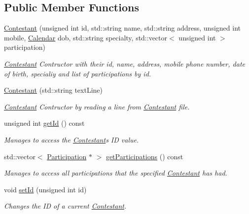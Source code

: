 \subsection*{Public Member Functions}
\begin{DoxyCompactItemize}
\item 
\hyperlink{class_contestant_a4f6ad68b8ea17d3cfc18581f62ea4806}{Contestant} (unsigned int id, std\+::string name, std\+::string address, unsigned int mobile, \hyperlink{class_calendar}{Calendar} dob, std\+::string specialty, std\+::vector$<$ unsigned int $>$ participation)
\begin{DoxyCompactList}\small\item\em \hyperlink{class_contestant}{Contestant} Contructor with their id, name, address, mobile phone number, date of birth, specialiy and list of participations by id. \end{DoxyCompactList}\item 
\hyperlink{class_contestant_ad9d2408c8ffd36832801c25d836be630}{Contestant} (std\+::string text\+Line)
\begin{DoxyCompactList}\small\item\em \hyperlink{class_contestant}{Contestant} Contructor by reading a line from \hyperlink{class_contestant}{Contestant} file. \end{DoxyCompactList}\item 
unsigned int \hyperlink{class_contestant_af3b5ca4f5150092fac946d6aa7301cd3}{get\+Id} () const
\begin{DoxyCompactList}\small\item\em Manages to access the \hyperlink{class_contestant}{Contestant}\textquotesingle{}s ID value. \end{DoxyCompactList}\item 
std\+::vector$<$ \hyperlink{class_participation}{Participation} $\ast$ $>$ \hyperlink{class_contestant_abd0caa85a134d63212cf9e0f9ccc7a1d}{get\+Participations} () const
\begin{DoxyCompactList}\small\item\em Manages to access all participations that the specified \hyperlink{class_contestant}{Contestant} has had. \end{DoxyCompactList}\item 
void \hyperlink{class_contestant_add8973daf90279756d9ba846dcbffa67}{set\+Id} (unsigned int id)
\begin{DoxyCompactList}\small\item\em Changes the ID of a current \hyperlink{class_contestant}{Contestant}. \end{DoxyCompactList}\item 

\end{DoxyCompactItemize}
